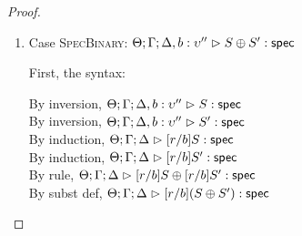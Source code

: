 \begin{proof}
\begin{enumerate}
  For semantics, consider
  $\interp{\judgeS[\Theta; \Gamma; \Delta]
                  {[r/b](Q \beta:\kappa'.\;S)}}\;\theta\;\gamma\;\delta$ 
  \begin{eqnproof}
          {Semantics}
          {Induction}
          {Semantics}
  \end{eqnproof}


\item Case \textsc{SpecBinary}: $\judgeS[\Theta; \Gamma; \Delta, b:\upsilon'']{S \oplus S'}$
  
  First, the syntax:
  \begin{tabbedproof}
    \oo By inversion, $\judgeS[\Theta; \Gamma; \Delta, b:\upsilon'']{S}$\\
    \oo By inversion, $\judgeS[\Theta; \Gamma; \Delta, b:\upsilon'']{S'}$\\
    \oo By induction, $\judgeS[\Theta; \Gamma; \Delta]{[r/b]S}$\\
    \oo By induction, $\judgeS[\Theta; \Gamma; \Delta]{[r/b]S'}$\\
    \oo By rule, $\judgeS[\Theta; \Gamma; \Delta]{[r/b]S \oplus [r/b]S'}$\\
    \oo By subst def, $\judgeS[\Theta; \Gamma; \Delta]{[r/b](S \oplus S')}$\\
  \end{tabbedproof}


\end{enumerate}
\end{proof}
